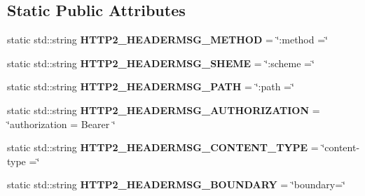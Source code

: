 \subsection*{Static Public Attributes}
\begin{DoxyCompactItemize}
\item 
\mbox{\label{classNetwork_1_1HTTP_1_1HTTP2Header_ab9032cab42b1a181f2fe3c36e27898af}} 
static std\+::string {\bfseries H\+T\+T\+P2\+\_\+\+H\+E\+A\+D\+E\+R\+M\+S\+G\+\_\+\+M\+E\+T\+H\+OD} = \char`\"{}\+:method =\char`\"{}
\item 
\mbox{\label{classNetwork_1_1HTTP_1_1HTTP2Header_a985dd761e9bf960ff543669d56b024a8}} 
static std\+::string {\bfseries H\+T\+T\+P2\+\_\+\+H\+E\+A\+D\+E\+R\+M\+S\+G\+\_\+\+S\+H\+E\+ME} = \char`\"{}\+:scheme =\char`\"{}
\item 
\mbox{\label{classNetwork_1_1HTTP_1_1HTTP2Header_ab086b8e43fc776f32c98cc4eb5a570a6}} 
static std\+::string {\bfseries H\+T\+T\+P2\+\_\+\+H\+E\+A\+D\+E\+R\+M\+S\+G\+\_\+\+P\+A\+TH} = \char`\"{}\+:path =\char`\"{}
\item 
\mbox{\label{classNetwork_1_1HTTP_1_1HTTP2Header_a42fc3732482636cf906fdd766ce08c4f}} 
static std\+::string {\bfseries H\+T\+T\+P2\+\_\+\+H\+E\+A\+D\+E\+R\+M\+S\+G\+\_\+\+A\+U\+T\+H\+O\+R\+I\+Z\+A\+T\+I\+ON} = \char`\"{}authorization = Bearer \char`\"{}
\item 
\mbox{\label{classNetwork_1_1HTTP_1_1HTTP2Header_aa38e7c6b7e97a0fb8b03029a1f33d765}} 
static std\+::string {\bfseries H\+T\+T\+P2\+\_\+\+H\+E\+A\+D\+E\+R\+M\+S\+G\+\_\+\+C\+O\+N\+T\+E\+N\+T\+\_\+\+T\+Y\+PE} = \char`\"{}content-\/type =\char`\"{}
\item 
\mbox{\label{classNetwork_1_1HTTP_1_1HTTP2Header_a0cb32888b64de0e444b427fe526a00f0}} 
static std\+::string {\bfseries H\+T\+T\+P2\+\_\+\+H\+E\+A\+D\+E\+R\+M\+S\+G\+\_\+\+B\+O\+U\+N\+D\+A\+RY} = \char`\"{}boundary=\char`\"{}
\item 
\mbox{\label{classNetwork_1_1HTTP_1_1HTTP2Header_a10fa685cb3887279330d5bbb2adb3a3a}} 

\end{DoxyCompactItemize}
